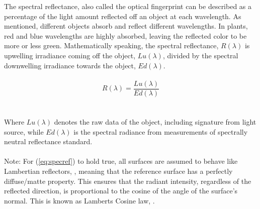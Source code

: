 \noindent
The spectral reflectance, also called the optical fingerprint can be described as a percentage of the light amount reflected off an object at each wavelength. As mentioned, different objects absorb and reflect different wavelengths. In plants, red and blue wavelengths are highly absorbed, leaving the reflected color to be more or less green. Mathematically speaking, the spectral reflectance, $R(\lambda)$ is upwelling irradiance coming off the object, $Lu(\lambda)$, divided by the spectral downwelling irradiance towards the object, $Ed(\lambda)$. \cite{johnsen_volent_2013}
\\\\
\begin{equation} \label{eq:specref}
    R(\lambda) = \frac{Lu(\lambda)}{Ed(\lambda)}
\end{equation}
\\\\
Where $Lu(\lambda)$ denotes the raw data of the object, including signature from light source, while $Ed(\lambda)$ is the spectral radiance from measurements of spectrally neutral reflectance standard. \cite{johnsen_ludvigsen_sørensen_aas_2016}
\\\\
Note: For (\ref{eq:specref}) to hold true, all surfaces are assumed to behave like Lambertian reflectors, \cite{johnsen_ludvigsen_sørensen_aas_2016}, meaning that the reference surface has a perfectly diffuse/matte property. This ensures that the radiant intensity, regardless of the reflected direction, is proportional to the cosine of the angle of the surface's normal. This is known as Lamberts Cosine law, \cite{sigernes2018}.



